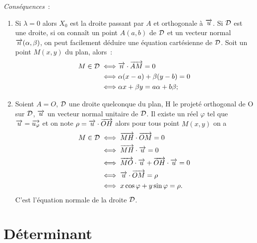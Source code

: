 \emph{Conséquences}~:
\begin{enumerate}
\item Si \(\lambda = 0\) alors \(X_0\) est la droite passant par \(A\) et orthogonale à \(\overrightarrow{u}\). Si \(\mathcal{D}\) est une droite, si on connaît un point \(A(a,b)\) de \(\mathcal{D}\) et un vecteur normal \(\overrightarrow{n}(\alpha,\beta)\), on peut facilement déduire une équation cartésienne de \(\mathcal{D}\). Soit un point \(M(x,y)\) du plan, alors~:
  \begin{align}
    M \in \mathcal{D}  \iff & \overrightarrow{n} \cdot \overrightarrow{AM}=0 \\
    \iff & \alpha(x-a)+\beta(y-b)=0\\
    \iff & \alpha x + \beta y=a \alpha + b \beta;
  \end{align}
\item Soient \(A=O\), \(\mathcal{D}\) une droite quelconque du plan, H le projeté orthogonal de O sur \(\mathcal{D}\), \(\overrightarrow{u}\) un vecteur normal unitaire de \(\mathcal{D}\). Il existe un réel \(\varphi\) tel que \(\overrightarrow{u}=\overrightarrow{u_\varphi}\) et on note \(\rho=\overrightarrow{u} \cdot \overrightarrow{OH}\) alors pour tous point \(M(x,y)\) on a 
  \begin{align}
    M \in \mathcal{D} & \iff \overrightarrow{MH} \cdot \overrightarrow{OM}=0 \\
    & \iff \overrightarrow{MH} \cdot \overrightarrow{u} =0 \\
    & \iff \overrightarrow{MO} \cdot \overrightarrow{u} +\overrightarrow{OH} \cdot \overrightarrow{u}=0\\
    & \iff \overrightarrow{u} \cdot \overrightarrow{OM}=\rho\\
    & \iff x \cos \varphi + y \sin \varphi=\rho.
  \end{align}
  C'est l'équation normale de la droite \(\mathcal{D}\).
\end{enumerate}

\section{Déterminant}
